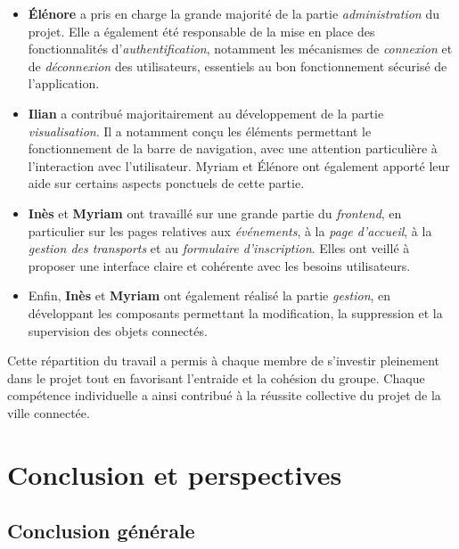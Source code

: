 \documentclass[a4paper,12pt]{report}
\begin{document}
\begin{itemize}
    \item \textbf{Élénore} a pris en charge la grande majorité de la partie \textit{administration} du projet. Elle a également été responsable de la mise en place des fonctionnalités d’\textit{authentification}, notamment les mécanismes de \textit{connexion} et de \textit{déconnexion} des utilisateurs, essentiels au bon fonctionnement sécurisé de l’application.
    
    \item \textbf{Ilian} a contribué majoritairement au développement de la partie \textit{visualisation}. Il a notamment conçu les éléments permettant le fonctionnement de la barre de navigation, avec une attention particulière à l’interaction avec l’utilisateur. Myriam et Élénore ont également apporté leur aide sur certains aspects ponctuels de cette partie.

    \item \textbf{Inès} et \textbf{Myriam} ont travaillé sur une grande partie du \textit{frontend}, en particulier sur les pages relatives aux \textit{événements}, à la \textit{page d'accueil}, à la \textit{gestion des transports} et au \textit{formulaire d’inscription}. Elles ont veillé à proposer une interface claire et cohérente avec les besoins utilisateurs.

    \item Enfin, \textbf{Inès} et \textbf{Myriam} ont également réalisé la partie \textit{gestion}, en développant les composants permettant la modification, la suppression et la supervision des objets connectés.
\end{itemize}

Cette répartition du travail a permis à chaque membre de s’investir pleinement dans le projet tout en favorisant l'entraide et la cohésion du groupe. Chaque compétence individuelle a ainsi contribué à la réussite collective du projet de la ville connectée.

	

	\newpage
	
	\section{Conclusion et perspectives}
	
	\subsection{Conclusion générale}
	
\end{document}
